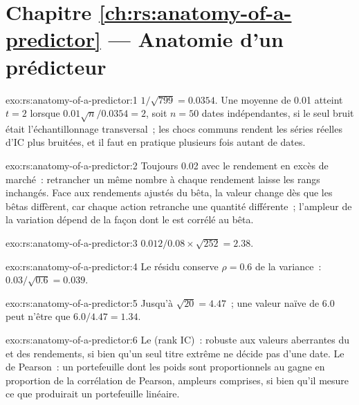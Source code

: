\section*{Chapitre \ref{ch:rs:anatomy-of-a-predictor} --- Anatomie d'un prédicteur}

\begin{solution}{exo:rs:anatomy-of-a-predictor:1}
$1/\sqrt{799} = 0.0354$. Une moyenne de 0.01 atteint $t = 2$ lorsque $0.01\sqrt n/0.0354 = 2$, soit $n = 50$ dates indépendantes, si le seul bruit
était l'échantillonnage transversal~; les chocs communs rendent les séries réelles d'IC plus bruitées, et il faut en pratique plusieurs fois autant de dates.
\end{solution}

\begin{solution}{exo:rs:anatomy-of-a-predictor:2}
Toujours 0.02 avec le rendement en excès de marché~: retrancher un même nombre à chaque rendement laisse les rangs inchangés. Face
aux rendements ajustés du bêta, la valeur change dès que les bêtas diffèrent, car chaque action retranche une quantité différente~; l'ampleur de la variation dépend de la façon dont
le  est corrélé au bêta.
\end{solution}

\begin{solution}{exo:rs:anatomy-of-a-predictor:3}
$0.012/0.08 \times \sqrt{252} = 2.38$.
\end{solution}

\begin{solution}{exo:rs:anatomy-of-a-predictor:4}
Le résidu conserve $\rho = 0.6$ de la variance~: $0.03/\sqrt{0.6} = 0.039$.
\end{solution}

\begin{solution}{exo:rs:anatomy-of-a-predictor:5}
Jusqu'à $\sqrt{20} = 4.47$~; une valeur naïve de 6.0 peut n'être que $6.0/4.47 = 1.34$.
\end{solution}

\begin{solution}{exo:rs:anatomy-of-a-predictor:6}
Le  (rank IC)~: robuste aux valeurs aberrantes du  et des rendements, si bien qu'un seul titre extrême ne décide pas d'une date. Le  de Pearson~: un portefeuille dont
les poids sont proportionnels au  gagne en proportion de la corrélation de Pearson, ampleurs comprises, si bien qu'il mesure ce que
produirait un portefeuille linéaire.
\end{solution}


